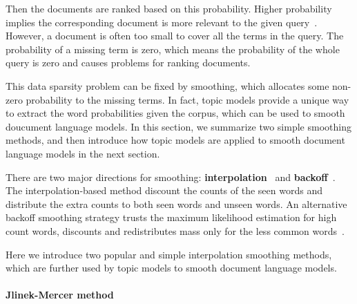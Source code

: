 Then the documents are ranked based on this probability. Higher
probability implies the corresponding document is more relevant to the
given query~\citep{song-99}. However, a document is often too small to
cover all the terms in the query. The probability of a missing term is
zero, which means the probability of the whole query is zero and
causes problems for ranking documents.

This data sparsity problem can be fixed by smoothing, which allocates
some non-zero probability to the missing terms. In fact, topic models
provide a unique way to extract the word probabilities given the
corpus, which can be used to smooth doucument language models.  In
this section, we summarize two simple smoothing methods, and then
introduce how topic models are applied to smooth document language
models in the next section.



There are two major directions for smoothing:
\textbf{interpolation}~\citep{Jelinek-1980,mackay95dirichlet,Ney-1994,PonteCroft,zhai-01}
and \textbf{backoff}~\citep{katz-87,song-99}. The interpolation-based
method discount the counts of the seen words and distribute the extra
counts to both seen words and unseen words. An alternative backoff
smoothing strategy trusts the maximum likelihood estimation for high
count words, discounts and redistributes mass only for the less common
words~\citep{zhai-01}.

Here we introduce two popular and simple interpolation smoothing
methods, which are further used by topic models to smooth document
language models.

\paragraph{Jlinek-Mercer method}

